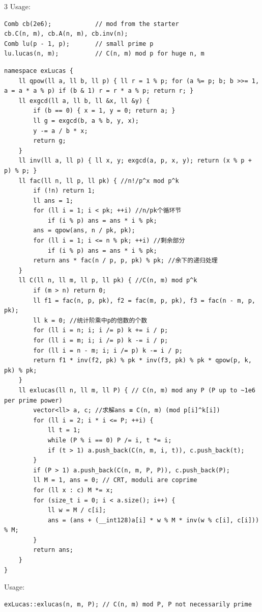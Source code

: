\documentclass[8pt]{extarticle}
\begin{document}
\begin{multicols*}{3}
Usage:

\begin{lstlisting}
Comb cb(2e6);            // mod from the starter
cb.C(n, m), cb.A(n, m), cb.inv(n);
Comb lu(p - 1, p);       // small prime p
lu.lucas(n, m);          // C(n, m) mod p for huge n, m
\end{lstlisting}

\begin{lstlisting}
namespace exLucas {
    ll qpow(ll a, ll b, ll p) { ll r = 1 % p; for (a %= p; b; b >>= 1, a = a * a % p) if (b & 1) r = r * a % p; return r; }
    ll exgcd(ll a, ll b, ll &x, ll &y) {
        if (b == 0) { x = 1, y = 0; return a; }
        ll g = exgcd(b, a % b, y, x);
        y -= a / b * x;
        return g;
    }
    ll inv(ll a, ll p) { ll x, y; exgcd(a, p, x, y); return (x % p + p) % p; }
    ll fac(ll n, ll p, ll pk) { //n!/p^x mod p^k
        if (!n) return 1;
        ll ans = 1;
        for (ll i = 1; i < pk; ++i) //n/pk个循环节
            if (i % p) ans = ans * i % pk;
        ans = qpow(ans, n / pk, pk);
        for (ll i = 1; i <= n % pk; ++i) //剩余部分
            if (i % p) ans = ans * i % pk;
        return ans * fac(n / p, p, pk) % pk; //余下的递归处理
    }
    ll C(ll n, ll m, ll p, ll pk) { //C(n, m) mod p^k
        if (m > n) return 0;
        ll f1 = fac(n, p, pk), f2 = fac(m, p, pk), f3 = fac(n - m, p, pk);
        ll k = 0; //统计阶乘中p的倍数的个数
        for (ll i = n; i; i /= p) k += i / p;
        for (ll i = m; i; i /= p) k -= i / p;
        for (ll i = n - m; i; i /= p) k -= i / p;
        return f1 * inv(f2, pk) % pk * inv(f3, pk) % pk * qpow(p, k, pk) % pk;
    }
    ll exlucas(ll n, ll m, ll P) { // C(n, m) mod any P (P up to ~1e6 per prime power)
        vector<ll> a, c; //求解ans ≡ C(n, m) (mod p[i]^k[i])
        for (ll i = 2; i * i <= P; ++i) {
            ll t = 1;
            while (P % i == 0) P /= i, t *= i;
            if (t > 1) a.push_back(C(n, m, i, t)), c.push_back(t);
        }
        if (P > 1) a.push_back(C(n, m, P, P)), c.push_back(P);
        ll M = 1, ans = 0; // CRT, moduli are coprime
        for (ll x : c) M *= x;
        for (size_t i = 0; i < a.size(); i++) {
            ll w = M / c[i];
            ans = (ans + (__int128)a[i] * w % M * inv(w % c[i], c[i])) % M;
        }
        return ans;
    }
}
\end{lstlisting}

Usage:

\begin{lstlisting}
exLucas::exlucas(n, m, P); // C(n, m) mod P, P not necessarily prime
\end{lstlisting}


\end{multicols*}
\end{document}
